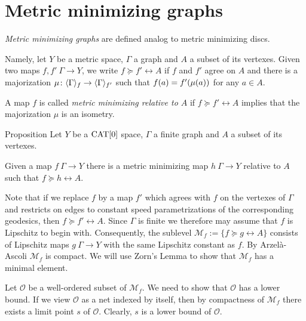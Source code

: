 \section{Metric minimizing graphs}\label{Metric minimizing graphs}

\emph{Metric minimizing graphs} are defined analog to metric minimizing discs.

Namely, let $Y$ be a metric space, $\Gamma$ a graph and $A$ a subset of its vertexes.
Given two maps $f,f'\:\Gamma\to Y$, we write $f\succcurlyeq f'\rel A$ if $f$ and $f'$ agree on $A$ 
and there is a majorization $\mu\colon\langle\Gamma\rangle_f\to \langle\Gamma\rangle_{f'}$
such that $f(a)\zz=f'(\mu(a))$ for any $a\in A$.

A map $f$ is called \emph{metric minimizing relative to $A$} if $f\succcurlyeq f'\rel A$ implies that the majorization $\mu$ is an isometry.

\begin{thm}{Proposition}\label{prop:metric-min-graph-exist}
Let $Y$ be a $\mathop{\rm CAT}\nolimits[0]$ space, 
$\Gamma$ a finite  graph and $A$ a subset of its vertexes.

Given a map $f\:\Gamma\to Y$ there is a metric minimizing map $h\:\Gamma\to Y$ relative to $A$
such that $f\succcurlyeq h\rel A$.
\end{thm}

Note that if we replace $f$ by a map $f'$ which agrees with $f$ on the vertexes of $\Gamma$ and
restricts on edges to constant speed parametrizations of the corresponding geodesics, then
$f\succcurlyeq f'\rel A$. Since $\Gamma$ is finite we therefore may assume that $f$ is Lipschitz to begin with.
Consequently, the sublevel $\mathcal{M}_f:=\{f\succcurlyeq g\rel A\}$ consists of Lipschitz maps $g\: \Gamma\to Y$ with the same Lipschitz
constant as $f$. By Arzel\`a-Ascoli $\mathcal{M}_f$ is compact.
 We will use Zorn's Lemma to show that 
$\mathcal{M}_f$ has a minimal element.

Let $\mathcal{O}$ be a well-ordered subset of $\mathcal{M}_f$. 
We need to show that $\mathcal{O}$ has a lower bound.
If we view $\mathcal{O}$ as a net indexed by itself, then by compactness of 
$\mathcal{M}_f$ there exists a limit point $s$ of $\mathcal{O}$. Clearly, $s$
is a lower bound of $\mathcal{O}$.
\qeds

